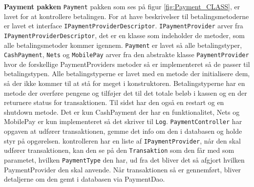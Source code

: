 \textbf{Payment pakken}
\newline
\texttt{Payment} pakken som ses på figur \ref{fig:Payment_CLASS}, er lavet for at kontrollere betalingen. For at have beskrivelser til betalingsmetoderne  er lavet et interface \texttt{IPaymentProviderDescriptor}. \texttt{IPaymentProvider} arver fra \texttt{IPaymentProviderDescriptor}, det er en klasse som indeholder de metoder, som alle betalingsmetoder kommer igennem. \texttt{Payment} er lavet så alle betalingstyper, \texttt{CashPayment}, \texttt{Nets} og \texttt{MobilePay} arver fra den abstrakte klasse \texttt{PaymentProvider} hvor de forskellige PaymentProviders metoder så er implementeret så de passer til betalingstypen. 
\newline
\newline
Alle betalingstyperne er lavet med en metode der initialisere dem, så der ikke kommer til at stå for meget i konstruktoren. Betalingstyperne har en metode der overføre pengene og tilføjer det til det totale beløb i kassen og en der returnere status for transaktionen. Til sidst har den også en restart og en shutdown metode. Det er kun CashPayment der har en funktionalitet, Nets og MobilePay er kun implementeret så det skriver til \texttt{Log}.  
\newline
\newline
\texttt{PaymentController} har opgaven at udfører transaktionen, gemme det info om den i databasen og holde styr på opgørelsen. kontrolleren har en liste af \texttt{IPaymentProvider}, når den skal udfører transaktionen, kan den se på den \texttt{Transaktion} som den får med som parametet, hvilken \texttt{PaymentType} den har, ud fra det bliver det så afgjort hvilken PaymentProvider den skal anvende. Når transaktionen så er gennemført, bliver detaljerne om den gemt i databasen via PaymentDao. 

